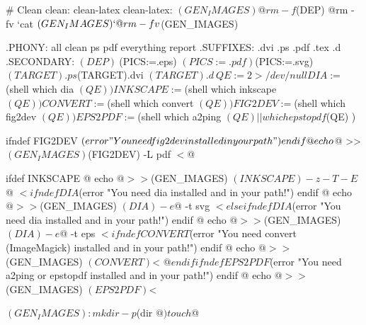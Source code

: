# Clean
clean: clean-latex
clean-latex: $(GEN_IMAGES)
	@rm -f $(DEP)
	@rm -fv `cat $(GEN_IMAGES)`
	@rm -fv $(GEN_IMAGES)

.PHONY: all clean ps pdf everything report
.SUFFIXES: .dvi .ps .pdf .tex .d
.SECONDARY: $(DEP) \
	$(PICS:=.eps) $(PICS:=.pdf) $(PICS:=.svg) \
	$(TARGET).ps  $(TARGET).dvi $(TARGET).d   \


QE:=2>/dev/null

DIA      := $(shell which dia      $(QE))
INKSCAPE := $(shell which inkscape $(QE))
CONVERT  := $(shell which convert  $(QE))
FIG2DEV  := $(shell which fig2dev  $(QE))
EPS2PDF  := $(shell which a2ping   $(QE) || which epstopdf $(QE) )


ifndef FIG2DEV
	$(error "You need fig2dev installed in your path")
endif
	@ echo $@ >> $(GEN_IMAGES)
	$(FIG2DEV) -L pdf $< $@

ifdef INKSCAPE
	@ echo $@ >> $(GEN_IMAGES)
	$(INKSCAPE) -z -T -E $@ $< 
ifndef DIA
	$(error "You need dia installed and in your path!")
endif
	@ echo $@ >> $(GEN_IMAGES)
	$(DIA) -e $@ -t svg $<
else
ifndef DIA
	$(error "You need dia installed and in your path!")
endif
	@ echo $@ >> $(GEN_IMAGES)
	$(DIA) -e $@ -t eps $<

ifndef CONVERT
	$(error "You need convert (ImageMagick) installed and in your path!")
endif
	@ echo $@ >> $(GEN_IMAGES)
	$(CONVERT) $< $@
endif

ifndef EPS2PDF
	$(error "You need a2ping or epstopdf installed and in your path!")
endif
	@ echo $@ >> $(GEN_IMAGES)
	$(EPS2PDF) $< 

$(GEN_IMAGES):
	mkdir -p $(dir $@)
	touch $@
